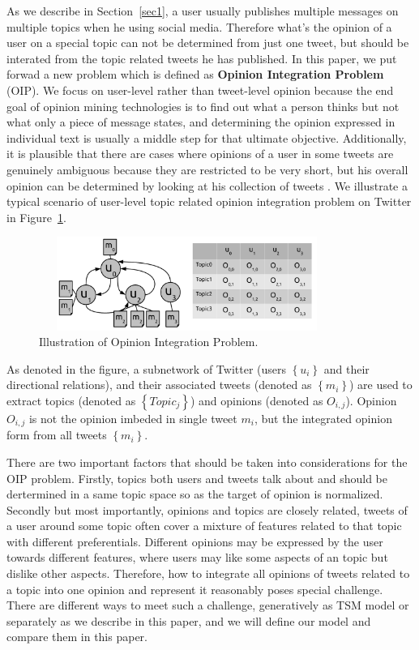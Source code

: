 \documentclass[runningheads,a4paper]{llncs}
\begin{document}
As we describe in Section~\ref{sec1}, a user usually publishes multiple messages on multiple topics when he using social media. Therefore what's the opinion of a user on a special topic can not be determined from just one tweet, but should be interated from the topic related tweets he has published. In this paper, we put forwad a new problem which is defined as \textbf{Opinion Integration Problem} (OIP). We focus on user-level rather than tweet-level opinion because the end goal of opinion mining technologies is to find out what a person thinks but not what only a piece of message states, and determining the opinion expressed in individual text is usually a middle step for that ultimate objective. Additionally, it is plausible that there are cases where opinions of a user in some tweets are genuinely ambiguous because they are restricted to be very short, but his overall opinion can be determined by looking at his collection of tweets \cite{tan2011user}. 
We illustrate a typical scenario of user-level topic related opinion integration problem on Twitter in Figure~\ref{fig2}.
\begin{figure}[htb]
\centering
\includegraphics[width=3.8in,height=1.2in]{ego.pdf}
\caption{Illustration of Opinion Integration Problem.}
\label{fig2}
\end{figure}
As denoted in the figure, a subnetwork of Twitter (users $ \left\{ u_{i} \right\} $ and their directional relations), and their associated tweets (denoted as $ \left\{ m_{i} \right\} $) are used to extract topics (denoted as $ \left\{ Topic_{j} \right\} $) and opinions (denoted as $ O_{i,j} $). Opinion $ O_{i,j} $ is not the opinion imbeded in single tweet $ m_{i} $, but the integrated opinion form from all tweets $ \left\{ m_{i} \right\} $. 

There are two important factors that should be taken into considerations for the OIP problem. Firstly, topics both users and tweets talk about and should be dertermined in a same topic space so as the target of opinion is normalized. Secondly but most importantly, opinions and topics are closely related, tweets of a user around some topic often cover a mixture of features related to that topic with different preferentials. Different opinions may be expressed by the user towards different features, where users may like some aspects of an topic but dislike other aspects. Therefore, how to integrate all opinions of tweets related to a topic into one opinion and represent it reasonably poses special challenge. There are different ways to meet such a challenge, generatively as TSM model or separately as we describe in this paper, and we will define our model and compare them in this paper. 
\end{document}
